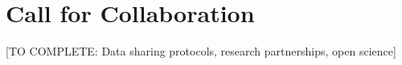 \section{Call for Collaboration}

[TO COMPLETE: Data sharing protocols, research partnerships, open science]